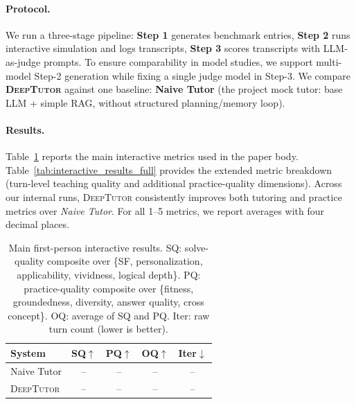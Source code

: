   \paragraph{Protocol.}
We run a three-stage pipeline:
\textbf{Step 1} generates benchmark entries,
\textbf{Step 2} runs interactive simulation and logs transcripts,
\textbf{Step 3} scores transcripts with LLM-as-judge prompts.
To ensure comparability in model studies, we support multi-model Step-2 generation while fixing a single judge model in Step-3.
We compare \textbf{\textsc{DeepTutor}} against one baseline:
\textbf{Naive Tutor} (the project mock tutor: base LLM + simple RAG, without structured planning/memory loop).
  
  \paragraph{Results.}
Table~\ref{tab:interactive_results_main} reports the main interactive metrics used in the paper body.
Table~\ref{tab:interactive_results_full} provides the extended metric breakdown (turn-level teaching quality and additional practice-quality dimensions).
Across our internal runs, \textsc{DeepTutor} consistently improves both tutoring and practice metrics over \textit{Naive Tutor}. For all 1--5 metrics, we report averages with four decimal places.
  
  \begin{table}[t]
  \centering
  \small
  \begin{tabular}{lcccc}
  \toprule
  \textbf{System} & \textbf{SQ}$\uparrow$ & \textbf{PQ}$\uparrow$ & \textbf{OQ}$\uparrow$ & \textbf{Iter}$\downarrow$ \\
  \midrule
  Naive Tutor          & --  & --  & --  & -- \\
  \textsc{DeepTutor}   & --  & --  & --  & -- \\
  \bottomrule
  \end{tabular}
\caption{Main first-person interactive results. SQ: solve-quality composite over \{SF, personalization, applicability, vividness, logical depth\}. PQ: practice-quality composite over \{fitness, groundedness, diversity, answer quality, cross concept\}. OQ: average of SQ and PQ. Iter: raw turn count (lower is better).
  }
  \label{tab:interactive_results_main}
  \end{table}

